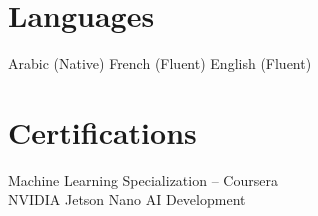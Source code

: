 \documentclass[10pt, letterpaper]{article}
\begin{document}
\section{Languages}
Arabic (Native) \quad French (Fluent) \quad English (Fluent)

\section{Certifications}
Machine Learning Specialization – Coursera \\
NVIDIA Jetson Nano AI Development
\end{document}
